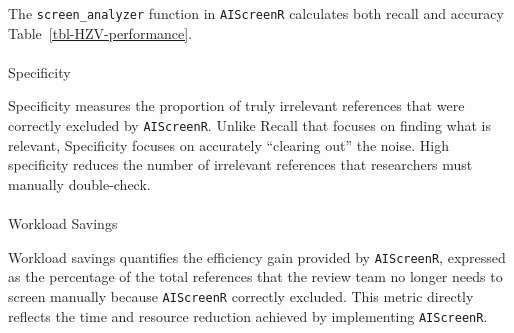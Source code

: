 \documentclass[
  letterpaper,
  DIV=11,
  numbers=noendperiod]{scrartcl}
\makeatletter
\let\oldparagraph\paragraph
\renewcommand{\paragraph}{
    \@ifstar
      \xxxParagraphStar
      \xxxParagraphNoStar
  }
\newcommand{\xxxParagraphStar}[1]{\oldparagraph*{#1}\mbox{}}
\newcommand{\xxxParagraphNoStar}[1]{\oldparagraph{#1}\mbox{}}
\makeatother
\begin{document}
The \texttt{screen\_analyzer} function in \texttt{AIScreenR} calculates
both recall and accuracy Table~\ref{tbl-HZV-performance}.

\begin{table}

\caption{\label{tbl-HZV-performance}Performance metrics of AIScreenR
results}


\end{table}%

\paragraph{Specificity}\label{specificity}

Specificity measures the proportion of truly irrelevant references that
were correctly excluded by \texttt{AIScreenR}. Unlike Recall that
focuses on finding what is relevant, Specificity focuses on accurately
``clearing out'' the noise. High specificity reduces the number of
irrelevant references that researchers must manually double-check.

\paragraph{Workload Savings}\label{workload-savings}

Workload savings quantifies the efficiency gain provided by
\texttt{AIScreenR}, expressed as the percentage of the total references
that the review team no longer needs to screen manually because
\texttt{AIScreenR} correctly excluded. This metric directly reflects the
time and resource reduction achieved by implementing \texttt{AIScreenR}.
\end{document}
